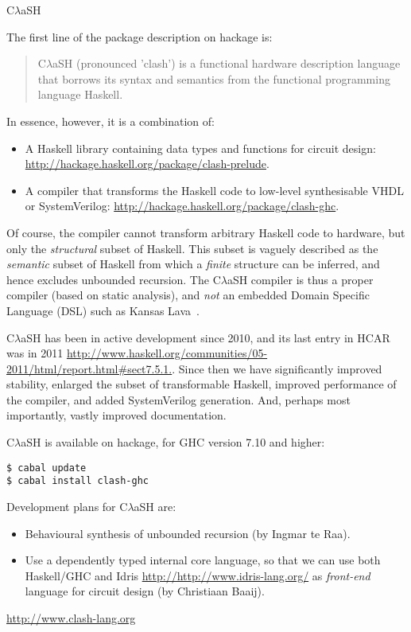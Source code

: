 \documentclass[DIV16,twocolumn,10pt]{scrreprt}
\begin{document}
\begin{hcarentry}{\texorpdfstring{C$\lambda$aSH}{CLaSH}}
\makeheader

The first line of the package description on hackage is:
\begin{quote}
C$\lambda$aSH (pronounced 'clash') is a functional hardware description language that borrows its syntax and semantics from the functional programming language Haskell.
\end{quote}

In essence, however, it is a combination of:
\begin{itemize}
  \item A Haskell library containing data types and functions for circuit design: \url{http://hackage.haskell.org/package/clash-prelude}.
  \item A compiler that transforms the Haskell code to low-level synthesisable VHDL or SystemVerilog: \url{http://hackage.haskell.org/package/clash-ghc}.
\end{itemize}
Of course, the compiler cannot transform arbitrary Haskell code to hardware, but only the \emph{structural} subset of Haskell.
This subset is vaguely described as the \emph{semantic} subset of Haskell from which a \emph{finite} structure can be inferred, and hence excludes unbounded recursion.
The C$\lambda$aSH compiler is thus a proper compiler (based on static analysis), and \emph{not} an embedded Domain Specific Language (DSL) such as Kansas Lava~\cite{klava}.

C$\lambda$aSH has been in active development since 2010, and its last entry in HCAR was in 2011 \url{http://www.haskell.org/communities/05-2011/html/report.html#sect7.5.1.}.
Since then we have significantly improved stability, enlarged the subset of transformable Haskell, improved performance of the compiler, and added SystemVerilog generation.
And, perhaps most importantly, vastly improved documentation.

C$\lambda$aSH is available on hackage, for GHC version 7.10 and higher:
\begin{verbatim}
$ cabal update
$ cabal install clash-ghc
\end{verbatim}

Development plans for C$\lambda$aSH are:
\begin{itemize}
  \item Behavioural synthesis of unbounded recursion (by Ingmar te Raa).
  \item Use a dependently typed internal core language, so that we can use both Haskell/GHC and Idris \url{http://http://www.idris-lang.org/} as \emph{front-end} language for circuit design (by Christiaan Baaij).
\end{itemize}

\FurtherReading
  \url{http://www.clash-lang.org}
\end{hcarentry}
\end{document}
